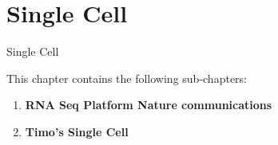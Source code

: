 \cleartorightpage

\chapter{Single Cell}\label{chapter:sc}

\setcounter{figure}{-1}
\setcounter{table}{-1}
\setcounter{section}{-1}

Single Cell

This chapter contains the following sub-chapters:

\begin{enumerate}[label=\ref{chapter:training}.\arabic*]
\itemsep-0.5em
\setcounter{enumi}{-1}
\item \textbf{RNA Seq Platform Nature communications}
\item \textbf{Timo's Single Cell}
\end{enumerate}
